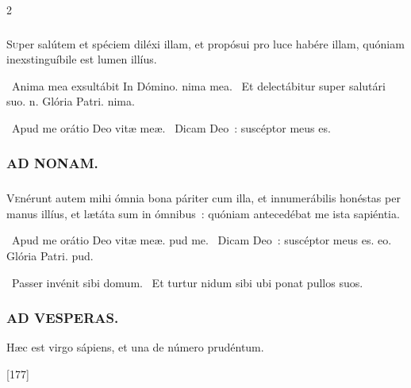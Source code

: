 \documentclass[9pt,twoside]{extarticle}
\begin{document}
\begin{multicols}{2}
{{\subsubsection*{}
\lettrine{S}uper salútem et spéciem diléxi illam, et propósui pro luce habére illam, quóniam inexstinguíbile est lumen illíus.

\begin{tightlist}{}
\item {}~Anima mea exsultábit \textred{*} In Dómino. nima mea. ~Et delectábitur super salutári suo. n. Glória Patri. nima.
\item {}~Apud me orátio Deo vitæ meæ. ~Dicam Deo~: suscéptor meus es.
\end{tightlist}

\subsubsection*{\center \textsc{AD NONAM.}}
\subsubsection*{}
\lettrine{V}enérunt autem mihi ómnia bona páriter cum illa, et innumerábilis honéstas per manus illíus, et lætáta sum in ómnibus~: quóniam antecedébat me ista sapiéntia.

\begin{tightlist}{}
\item {}~Apud me orátio \textred{*} Deo vitæ meæ. pud me. ~Dicam Deo~: suscéptor meus es. eo. Glória Patri. pud.
\item {}~Passer invénit sibi domum. ~Et turtur nidum sibi ubi ponat pullos suos.
\end{tightlist}

\subsubsection*{\center \textsc{AD VESPERAS.}}
\begin{tightlist}{}
\item {} Hæc est virgo sápiens, et una de número prudéntum.
\item {} [177]
\end{tightlist}

}}
\end{multicols}
\end{document}
